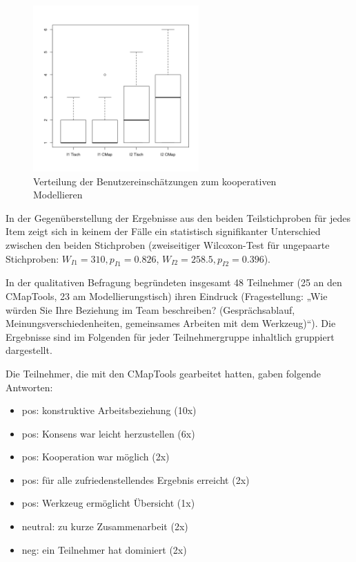 \begin{figure}[htbp]
	\centering
		\includegraphics[height=2.5in]{img/Evaluierung/kollaboration_vergleich.png}
	\caption{Verteilung der Benutzereinschätzungen zum kooperativen Modellieren}
	\label{fig:img_Evaluierung_kollaboration_vergleich}
\end{figure}

In der Gegenüberstellung der Ergebnisse aus den beiden Teilstichproben für jedes Item zeigt sich in keinem der Fälle ein statistisch signifikanter Unterschied zwischen den beiden Stichproben (zweiseitiger Wilcoxon-Test für ungepaarte Stichproben: $W_{I1}=310, p_{I1}=0.826$, $W_{I2}=258.5, p_{I2}=0.396$).

In der qualitativen Befragung begründeten insgesamt 48 Teilnehmer (25 an den CMapTools, 23 am Modellierungstisch) ihren Eindruck (Fragestellung: „Wie würden Sie Ihre Beziehung im Team beschreiben? (Gesprächsablauf, Meinungsverschiedenheiten, gemeinsames Arbeiten mit dem Werkzeug)“). Die Ergebnisse sind im Folgenden für jeder Teilnehmergruppe inhaltlich gruppiert dargestellt.

Die Teilnehmer, die mit den CMapTools gearbeitet hatten, gaben folgende Antworten:
\begin{itemize}
	\item pos: konstruktive Arbeitsbeziehung (10x)
	\item pos: Konsens war leicht herzustellen (6x)
	\item pos: Kooperation war möglich (2x)
	\item pos: für alle zufriedenstellendes Ergebnis erreicht (2x)
	\item pos: Werkzeug ermöglicht Übersicht (1x)
	\item neutral: zu kurze Zusammenarbeit (2x)
	\item neg: ein Teilnehmer hat dominiert (2x)
\end{itemize}

